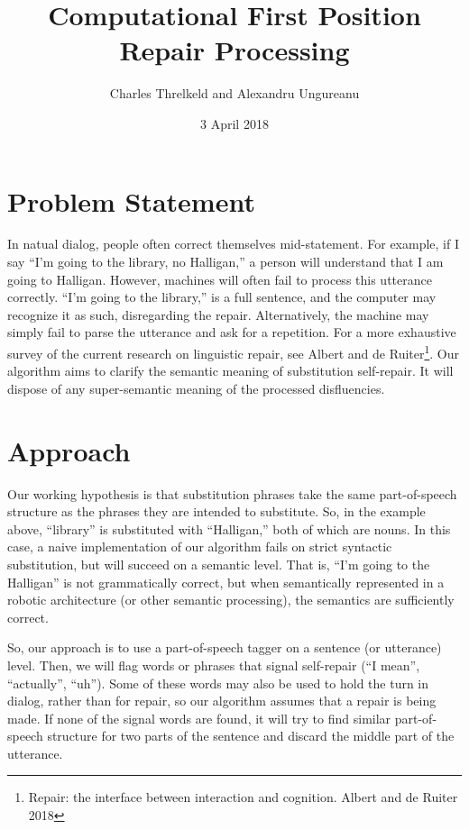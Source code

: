 \documentclass{article}
\title{Computational First Position Repair Processing}
\author{Charles Threlkeld and Alexandru Ungureanu}
\date{3 April 2018}
\begin{document}
\maketitle

\section{Problem Statement}

\begin{flushleft}
In natual dialog, people often correct themselves mid-statement. For example, if I say ``I'm going to the library, no Halligan,'' a person will understand that I am going to Halligan. However, machines will often fail to process this utterance correctly. ``I'm going to the library,'' is a full sentence, and the computer may recognize it as such, disregarding the repair. Alternatively, the machine may simply fail to parse the utterance and ask for a repetition. For a more exhaustive survey of the current research on linguistic repair, see Albert and de Ruiter\footnote{Repair: the interface between interaction and cognition. Albert and de Ruiter 2018}. Our algorithm aims to clarify the semantic meaning of substitution self-repair. It will dispose of any super-semantic meaning of the processed disfluencies.

\end{flushleft}

\section{Approach}

\begin{flushleft}

Our working hypothesis is that substitution phrases take the same part-of-speech structure as the phrases they are intended to substitute. So, in the example above, ``library'' is substituted with ``Halligan,'' both of which are nouns. In this case, a naive implementation of our algorithm fails on strict syntactic substitution, but will succeed on a semantic level. That is, ``I'm going to the Halligan'' is not grammatically correct, but when semantically represented in a robotic architecture (or other semantic processing), the semantics are sufficiently correct.

\end{flushleft}

\begin{flushleft}

So, our approach is to use a part-of-speech tagger on a sentence (or utterance) level. Then, we will flag words or phrases that signal self-repair (``I mean'', ``actually'', ``uh''). Some of these words may also be used to hold the turn in dialog, rather than for repair, so our algorithm assumes that a repair is being made. If none of the signal words are found, it will try to find similar part-of-speech structure for two parts of the sentence and discard the middle part of the utterance.

\end{flushleft}
\end{document}
